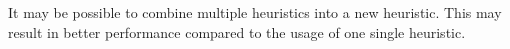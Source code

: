 
It may be possible to combine multiple heuristics into a new heuristic. This 
may result in better performance compared to the usage of one single 
heuristic.